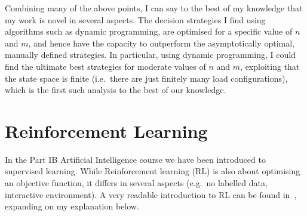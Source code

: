 \begin{itemize}

\end{itemize}

Combining many of the above points, I can say to the best of my knowledge that my work is novel in several aspects. The decision strategies I find using algorithms such as dynamic programming, are optimised for a specific value of $n$ and $m$, and hence have the capacity to outperform the asymptotically optimal, manually defined strategies. In particular, using dynamic programming, I could find the ultimate best strategies for moderate values of $n$ and $m$, exploiting that the state space is finite (i.e.\ there are just finitely many load configurations), which is the first such analysis to the best of our knowledge.


\section{Reinforcement Learning} \label{RLintro}


In the Part IB Artificial Intelligence course we have been introduced to supervised learning. While Reinforcement learning (RL) is also about optimising an objective function, it differs in several aspects (e.g.\ no labelled data, interactive environment). A very readable introduction to RL can be found in~\cite{sutton2018RLbook}, expanding on my explanation below.


